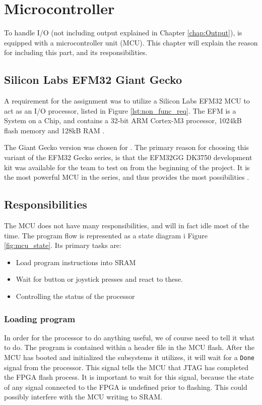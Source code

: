 \chapter{Microcontroller}

To handle I/O (not including output explained in Chapter \ref{chap:Output}), \vthreek is equipped with a microcontroller unit (MCU).
This chapter will explain the reason for including this part, and its responsibilities. 

\section{Silicon Labs EFM32 Giant Gecko}
A requirement for the assignment was to utilize a Silicon Labs EFM32 MCU to act as an I/O processor, listed in Figure \ref{lst:non_func_req}.
The EFM is a System on a Chip, and contains a 32-bit ARM Cortex-M3 processor, 1024kB flash memory and 128kB RAM \cite{efm32referencemanual}.

The Giant Gecko version was chosen for \vthreek.
The primary reason for choosing this variant of the EFM32 Gecko series, is that the EFM32GG DK3750 development kit was available for the team to test on from the beginning of the project.
It is the most powerful MCU in the series, and thus provides the most possibilities \cite{efm32}.

\section{Responsibilities}
The MCU does not have many responsibilities, and will in fact idle most of the time. The program flow is represented as a state diagram i Figure \ref{fig:mcu_state}.
Its primary tasks are: 
\begin{itemize}
\item Load program instructions into SRAM
\item Wait for button or joystick presses and react to these.
\item Controlling the status of the processor
\end{itemize}

\subsection{Loading program}
In order for the processor to do anything useful, we of course need to tell it what to do.
The program is contained within a header file in the MCU flash.
After the MCU has booted and initialized the subsystems it utilizes, it will wait for a \texttt{Done} signal from the processor.
This signal tells the MCU that JTAG has completed the FPGA flash process. 
It is important to wait for this signal, because the state of any signal connected to the FPGA is undefined prior to flashing.
This could possibly interfere with the MCU writing to SRAM.

